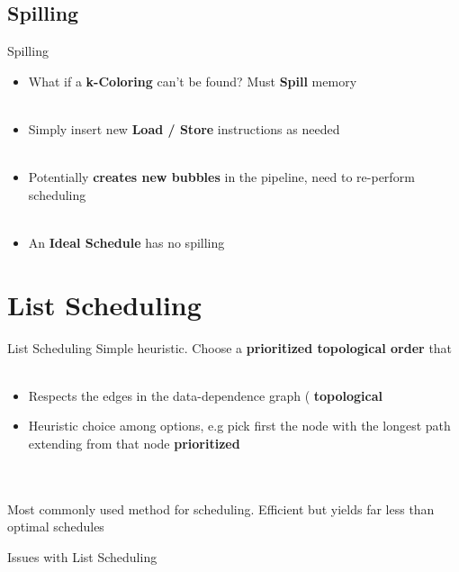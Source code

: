 \documentclass{beamer}
\begin{document}
\begin{darkframes}
\subsection{Spilling}
\begin{frame}{Spilling}
	\begin{itemize}
		\item What if a {\bf \color{cyan} k-Coloring} can't be found? Must {\bf \color{green} Spill} memory \\
		\qquad \\
		\pause
		\item Simply insert new {\bf \color{cyan} Load / Store} instructions as needed \\
		\qquad \\
		\pause
		\item Potentially {\bf \color{cyan} creates new bubbles} in the pipeline, need to re-perform scheduling \\
		\qquad \\
		\pause
		\item An {\bf \color{cyan} Ideal Schedule} has no spilling 
	\end{itemize}
\end{frame}

\section{List Scheduling}
\begin{frame}{List Scheduling}
	Simple heuristic.  Choose a {\bf \color{cyan} prioritized topological order} that \\
	\qquad \\
	\begin{itemize}
		\item Respects the edges in the data-dependence graph ({\bf \color{green} topological}
		\item Heuristic choice among options, e.g pick first the node with the longest path extending from that node {\bf \color{green} prioritized}
	\end{itemize}
	\qquad \\
	\qquad \\
	Most commonly used method for scheduling. Efficient but yields far less than optimal schedules
\end{frame}

\begin{frame}{Issues with List Scheduling}


\end{frame}
\end{darkframes}
\end{document}
